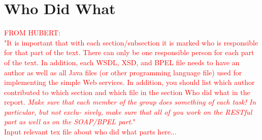 \chapter{Who Did What}
\textcolor{red}{FROM HUBERT:\\
"It is important that with each section/subsection it is marked who is responsible for that part of the text. There can only be one responsible person for each part of the text. In addition, each WSDL, XSD, and BPEL file needs to have an author as well as all Java files (or other programming language file) used for implementing the simple Web services. In addition, you should list which author contributed to which section and which file in the section Who did what in the report.
\textit{Make sure that each member of the group does something of each task! In particular, but not exclu- sively, make sure that all of you work on the RESTful part as well as on the SOAP/BPEL part.}"\\
Input relevant tex file about who did what parts here...}
